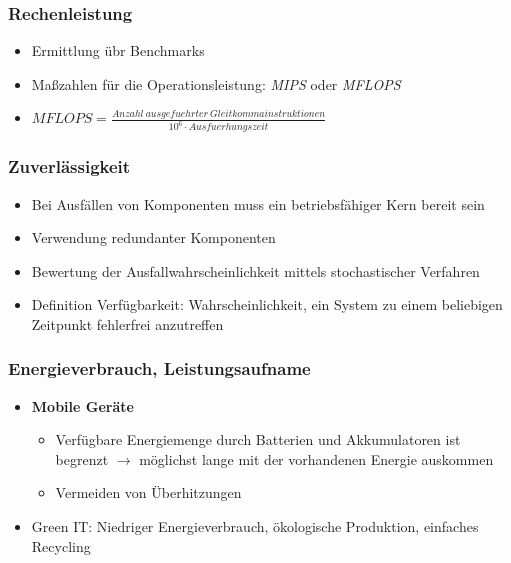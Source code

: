 \subsubsection{Rechenleistung}
\begin{itemize}
	\item Ermittlung übr Benchmarks
	\item Maßzahlen für die Operationsleistung: \textit{MIPS} oder \textit{MFLOPS}
	\item \(MFLOPS = \frac{Anzahl~ausgefuehrter~Gleitkommainstruktionen}{10^6 \cdot Ausfuerhungszeit}\)
\end{itemize}

\subsubsection{Zuverlässigkeit}
\begin{itemize}
	\item Bei Ausfällen von Komponenten muss ein betriebsfähiger Kern bereit sein
	\item Verwendung redundanter Komponenten
	\item Bewertung der Ausfallwahrscheinlichkeit mittels stochastischer Verfahren
	\item Definition Verfügbarkeit: Wahrscheinlichkeit, ein System zu einem beliebigen Zeitpunkt fehlerfrei anzutreffen
\end{itemize}

\subsubsection{Energieverbrauch, Leistungsaufname}
\begin{itemize}
	\item \textbf{Mobile Geräte}
	\begin{itemize}
		\item Verfügbare Energiemenge durch Batterien und Akkumulatoren ist begrenzt \(\rightarrow\) möglichst lange mit der vorhandenen Energie auskommen
		\item Vermeiden von Überhitzungen
	\end{itemize}
	\item Green IT: Niedriger Energieverbrauch, ökologische Produktion, einfaches Recycling
\end{itemize}


